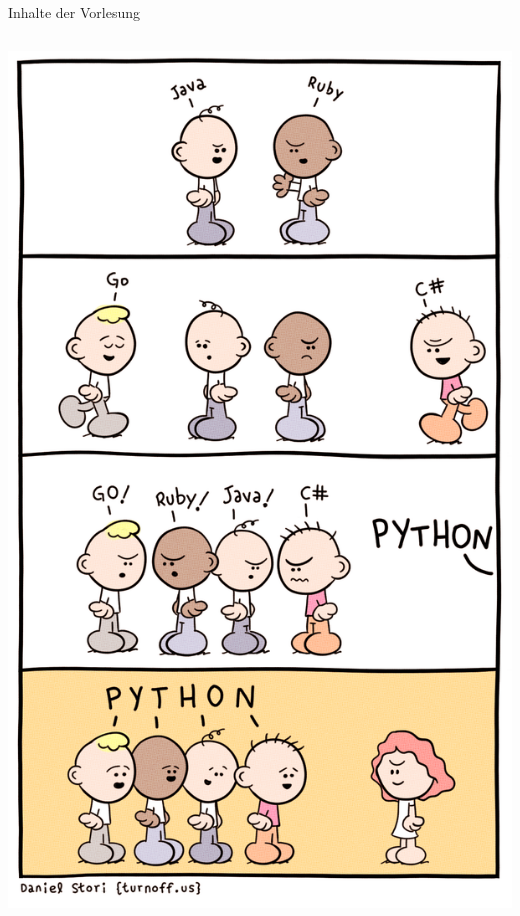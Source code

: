 {\begin{frame}{Inhalte der Vorlesung}
\begin{columns}
        \begin{column}[T]{.3\textwidth}
            \includegraphics[width=\textwidth]{img/depressed-developer-35}
        \end{column}
    \end{columns}
\end{frame}
}

